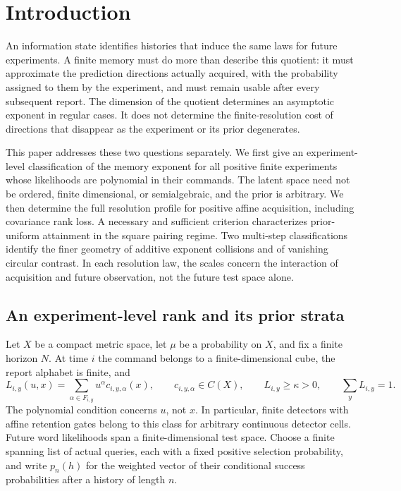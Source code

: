 \section{Introduction}
An information state identifies histories that induce the same laws for
future experiments. A finite memory must do more than describe this
quotient: it must approximate the prediction directions actually
acquired, with the probability assigned to them by the experiment, and
must remain usable after every subsequent report. The dimension of the
quotient determines an asymptotic exponent in regular cases. It does
not determine the finite-resolution cost of directions that disappear
as the experiment or its prior degenerates.

This paper addresses these two questions separately. We first give an
experiment-level classification of the memory exponent for all positive
finite experiments whose likelihoods are polynomial in their commands.
The latent space need not be ordered, finite dimensional, or
semialgebraic, and the prior is arbitrary. We then determine the full
resolution profile for positive affine acquisition, including covariance
rank loss. A necessary and sufficient criterion characterizes
prior-uniform attainment in the square pairing regime. Two multi-step
classifications identify the finer geometry of additive exponent
collisions and of vanishing circular contrast. In each resolution law,
the scales concern the interaction of acquisition and future observation,
not the future test space alone.

\subsection{An experiment-level rank and its prior strata}
Let $X$ be a compact metric space, let $\mu$ be a probability on $X$,
and fix a finite horizon $N$. At time $i$ the command belongs to a
finite-dimensional cube, the report alphabet is finite, and
\[
 L_{i,y}(u,x)=\sum_{\alpha\in F_{i,y}}u^\alpha c_{i,y,\alpha}(x),
 \qquad c_{i,y,\alpha}\in C(X),\qquad L_{i,y}\ge\kappa>0,
 \qquad\sum_yL_{i,y}=1.
\]
The polynomial condition concerns $u$, not $x$. In particular, finite
detectors with affine retention gates belong to this class for arbitrary
continuous detector cells. Future word likelihoods span a
finite-dimensional test space. Choose a finite spanning list of actual
queries, each with a fixed positive selection probability, and write
$p_n(h)$ for the weighted vector of their conditional success
probabilities after a history of length $n$.

